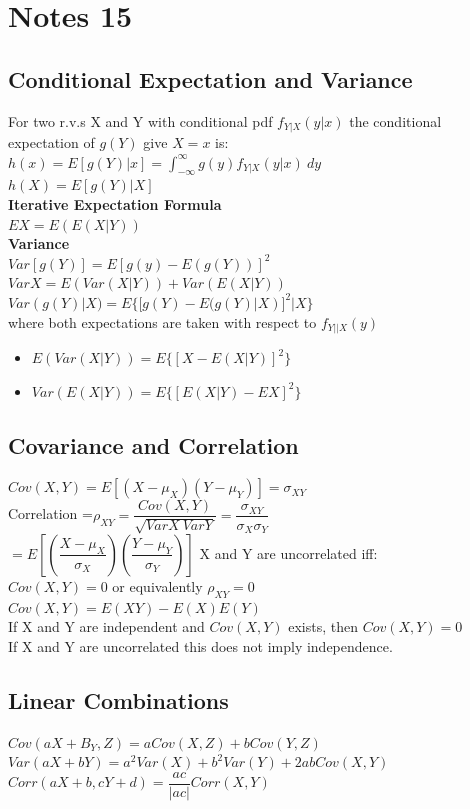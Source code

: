 \documentclass[openany]{book}
\begin{document}
\chapter{Notes 15}
\section{Conditional Expectation and Variance}
For two r.v.s X and Y with conditional pdf $f_{Y|X}(y|x)$ the conditional expectation of $g(Y)$ give $X=x$ is:\\
$h(x)=E[g(Y)|x]=\int_{-\infty}^{\infty}g(y)f_{Y|X}(y|x) \ dy$\\
$h(X)=E[g(Y)|X]$\\
\textbf{Iterative Expectation Formula}\\
$EX=E(E(X|Y))$\\
\textbf{Variance}\\
$Var[g(Y)]=E[g(y)-E(g(Y))]^2$\medbreak
$VarX=E(Var(X|Y))+Var(E(X|Y))$\\
$Var(g(Y)|X)=E\{[g(Y)-E(g(Y)|X)]^2|X\}$\\
where both expectations are taken with respect to $f_{Y||X}(y)$\\
\begin{itemize}
\item $E(Var(X|Y))=E\{[X-E(X|Y)]^2\}$\\
\item $Var(E(X|Y))=E\{[E(X|Y)-EX]^2\}$\\
\end{itemize}
\section{Covariance and Correlation}
$Cov(X,Y)=E[(X-\mu_X)(Y-\mu_Y)]=\sigma_{XY}$\\
Correlation =$\rho_{XY}=\dfrac{Cov(X,Y)}{\sqrt{VarX \ VarY}}=\dfrac{\sigma_{XY}}{\sigma_X \sigma_Y}$\\
$=E\left[ \left( \dfrac{X-\mu_X}{\sigma_X} \right) \left( \dfrac{Y-\mu_Y}{\sigma_Y} \right) \right]$\medbreak
X and Y are uncorrelated iff:\\
$Cov(X,Y)=0$ or equivalently $\rho_{XY}=0$\\
$Cov(X,Y)=E(XY)-E(X)E(Y)$\\
If X and Y are independent and $Cov(X,Y)$ exists, then $Cov(X,Y)=0$\\
If X and Y are uncorrelated this does not imply independence.\\
\section{Linear Combinations}
$Cov(aX+B_Y,Z)=aCov(X,Z)+bCov(Y,Z)$\medbreak
$Var(aX+bY)=a^2Var(X)+b^2Var(Y)+2abCov(X,Y)$\medbreak
$Corr(aX+b,cY+d)=\dfrac{ac}{|ac|}Corr(X,Y)$
\end{document}
